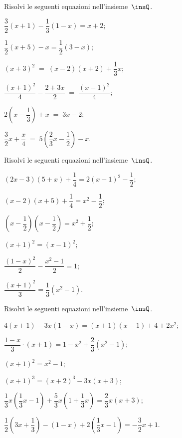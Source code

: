 \begin{esercizio}[\Ast]
\label{ese:15.36}
Risolvi le seguenti equazioni nell'insieme~$\insQ$.
\begin{multicols}{2}
\begin{enumeratea}
\spazielenx
 \item $\dfrac{3}{2}(x+1)-\dfrac{1}{3}(1-x)=x+2$;
 \item $\dfrac{1}{2}(x+5)-x=\dfrac{1}{2}(3-x)$;
 \item $(x+3)^{2}\;=\;(x-2)(x+2)+\dfrac{1}{3}x$;
 \item $\dfrac{(x+1)^{2}}{4}-\dfrac{2+3x}{2}\;=\;\dfrac{(x-1)^{2}}{4}$;
 \item $2\left(x-\dfrac{1}{3}\right)+x\;=\;3x-2$;
 \item $\dfrac{3}{2}x+\dfrac{x}{4}\;=\;5\left(\dfrac{2}{3}x-\dfrac{1}{2}\right)-x$.
\end{enumeratea}
\end{multicols}
\end{esercizio}

\begin{esercizio}[\Ast]
\label{ese:15.37}
Risolvi le seguenti equazioni nell'insieme~$\insQ$.
\begin{multicols}{2}
\begin{enumeratea}
\spazielenx
 \item $(2x-3)(5+x)+\dfrac{1}{4}=2(x-1)^{2}-\dfrac{1}{2}$;
 \item $(x-2)(x+5)+\dfrac{1}{4}=x^{2}-\dfrac{1}{2}$;
 \item $\left(x-\dfrac{1}{2}\right)\left(x-\dfrac{1}{2}\right)=x^{2}+\dfrac{1}{2}$;
 \item $(x+1)^{2}=(x-1)^{2}$;
 \item $\dfrac{(1-x)^{2}}{2}-\dfrac{x^{2}-1}{2}=1$;
 \item $\dfrac{(x+1)^{2}}{3}=\dfrac{1}{3}(x^{2}-1)$.
\end{enumeratea}
\end{multicols}
\end{esercizio}

\begin{esercizio}[\Ast]
\label{ese:15.38}
Risolvi le seguenti equazioni nell'insieme~$\insQ$.
\begin{enumeratea}
\spazielenx
 \item $4(x+1)-3x(1-x)=(x+1)(x-1)+4+2x^{2}$;
 \item $\dfrac{1-x}{3}\cdot (x+1)=1-x^{2}+\dfrac{2}{3}\left(x^{2}-1\right)$;
 \item $(x+1)^{2}=x^{2}-1$;
 \item $(x+1)^{3}=(x+2)^{3}-3x(x+3)$;
 \item $\dfrac{1}{3}x\left(\dfrac{1}{3}x-1\right)+\dfrac{5}{3}x\left(1+\dfrac{1}{3}x\right)=\dfrac{2}{3}x(x+3)$;
 \item $\dfrac{1}{2}\left(3x+\dfrac{1}{3}\right)-(1-x)+2\left(\dfrac{1}{3}x-1\right)=-{\dfrac{3}{2}}x+1$.
\end{enumeratea}
\end{esercizio}

